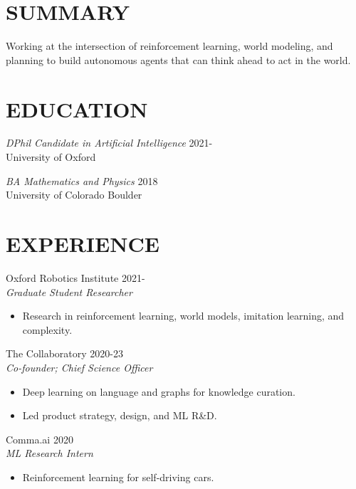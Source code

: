 \documentclass[margin]{res}
\begin{document}
\begin{resume}
    \section{SUMMARY}
    Working at the intersection of reinforcement learning, world modeling, and planning to
    build autonomous agents that can think ahead to act in the world.


  \section{EDUCATION} {\sl DPhil Candidate in Artificial Intelligence } \hfill 2021-\\
                University of Oxford

  {\sl BA Mathematics and Physics} \hfill 2018\\
  University of Colorado Boulder

\section{EXPERIENCE} Oxford Robotics Institute \hfill 2021- \\
                 {\sl Graduate Student Researcher}
                 \begin{itemize}  \itemsep -2pt %
                 \item Research in reinforcement learning, world models, imitation learning, and complexity.
                 \end{itemize}

                The Collaboratory \hfill 2020-23 \\
                 {\sl Co-founder; Chief Science Officer}
                 \begin{itemize}  \itemsep -2pt %
                 \item Deep learning on language and graphs for knowledge curation.
                 \item Led product strategy, design, and ML R\&D.
                 \end{itemize}

                 Comma.ai \hfill            2020 \\
		{\sl ML Research Intern}
                 \begin{itemize}  \itemsep -2pt %
                 \item Reinforcement learning for self-driving cars.
                 \end{itemize}


\end{resume}
\end{document}
